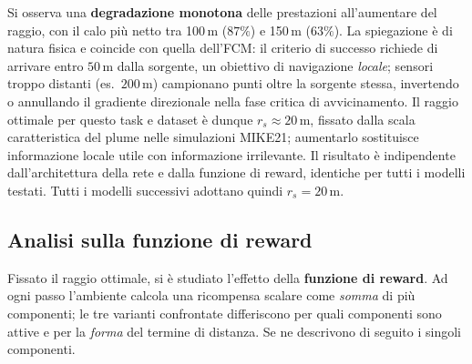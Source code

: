 Si osserva una \textbf{degradazione monotona} delle prestazioni all'aumentare del raggio,
con il calo pi\`u netto tra 100\,m ($87\%$) e 150\,m ($63\%$). La spiegazione \`e di
natura fisica e coincide con quella dell'FCM: il criterio di successo richiede di arrivare
entro $50\,\text{m}$ dalla sorgente, un obiettivo di navigazione \emph{locale}; sensori
troppo distanti (es.\ $200\,\text{m}$) campionano punti oltre la sorgente stessa,
invertendo o annullando il gradiente direzionale nella fase critica di avvicinamento. Il
raggio ottimale per questo task e dataset \`e dunque $r_s \approx 20\,\text{m}$, fissato
dalla scala caratteristica del plume nelle simulazioni MIKE21; aumentarlo sostituisce
informazione locale utile con informazione irrilevante. Il risultato \`e indipendente
dall'architettura della rete e dalla funzione di reward, identiche per tutti i modelli
testati. Tutti i modelli successivi adottano quindi $r_s = 20\,\text{m}$.

\subsection{Analisi sulla funzione di reward}
\label{sec:rl_reward}

Fissato il raggio ottimale, si \`e studiato l'effetto della \textbf{funzione di reward}. Ad
ogni passo l'ambiente calcola una ricompensa scalare come \emph{somma} di pi\`u componenti;
le tre varianti confrontate differiscono per quali componenti sono attive e per la
\emph{forma} del termine di distanza. Se ne descrivono di seguito i singoli componenti.

